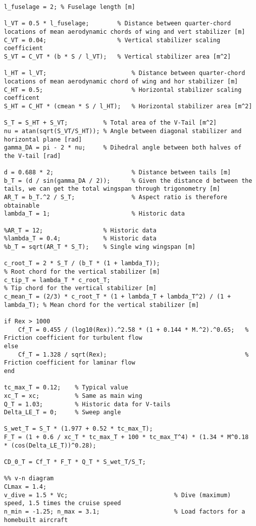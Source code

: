 \begin{verbatim}
l_fuselage = 2;	% Fuselage length [m]

l_VT = 0.5 * l_fuselage;		% Distance between quarter-chord locations of mean aerodynamic chords of wing and vert stabilizer [m]
C_VT = 0.04;					% Vertical stabilizer scaling coefficient
S_VT = C_VT * (b * S / l_VT);	% Vertical stabilizer area [m^2]

l_HT = l_VT;						% Distance between quarter-chord locations of mean aerodynamic chord of wing and hor stabilizer [m]
C_HT = 0.5;							% Horizontal stabilizer scaling coefficent
S_HT = C_HT * (cmean * S / l_HT);	% Horizontal stabilizer area [m^2]

S_T = S_HT + S_VT;			% Total area of the V-Tail [m^2]
nu = atan(sqrt(S_VT/S_HT));	% Angle between diagonal stabilizer and horizontal plane [rad]
gamma_DA = pi - 2 * nu;		% Dihedral angle between both halves of the V-tail [rad]

d = 0.688 * 2;						% Distance between tails [m]
b_T = (d / sin(gamma_DA / 2));		% Given the distance d between the tails, we can get the total wingspan through trigonometry [m]
AR_T = b_T.^2 / S_T;				% Aspect ratio is therefore obtainable
lambda_T = 1;						% Historic data

%AR_T = 12;                 % Historic data
%lambda_T = 0.4;			% Historic data
%b_T = sqrt(AR_T * S_T);	% Single wing wingspan [m]

c_root_T = 2 * S_T / (b_T * (1 + lambda_T));								% Root chord for the vertical stabilizer [m]
c_tip_T = lambda_T * c_root_T;												% Tip chord for the vertical stabilizer [m]
c_mean_T = (2/3) * c_root_T * (1 + lambda_T + lambda_T^2) / (1 + lambda_T);	% Mean chord for the vertical stabilizer [m]

if Rex > 1000
	Cf_T = 0.455 / (log10(Rex)).^2.58 * (1 + 0.144 * M.^2).^0.65;	% Friction coefficient for turbulent flow
else
	Cf_T = 1.328 / sqrt(Rex);										% Friction coefficient for laminar flow
end

tc_max_T = 0.12;	% Typical value
xc_T = xc;			% Same as main wing
Q_T = 1.03;			% Historic data for V-tails
Delta_LE_T = 0;		% Sweep angle

S_wet_T = S_T * (1.977 + 0.52 * tc_max_T);
F_T = (1 + 0.6 / xc_T * tc_max_T + 100 * tc_max_T^4) * (1.34 * M^0.18 * (cos(Delta_LE_T))^0.28);

CD_0_T = Cf_T * F_T * Q_T * S_wet_T/S_T;

%% v-n diagram
CLmax = 1.4;
v_dive = 1.5 * Vc;								% Dive (maximum) speed, 1.5 times the cruise speed
n_min = -1.25; n_max = 3.1;						% Load factors for a homebuilt aircraft


\end{verbatim}
